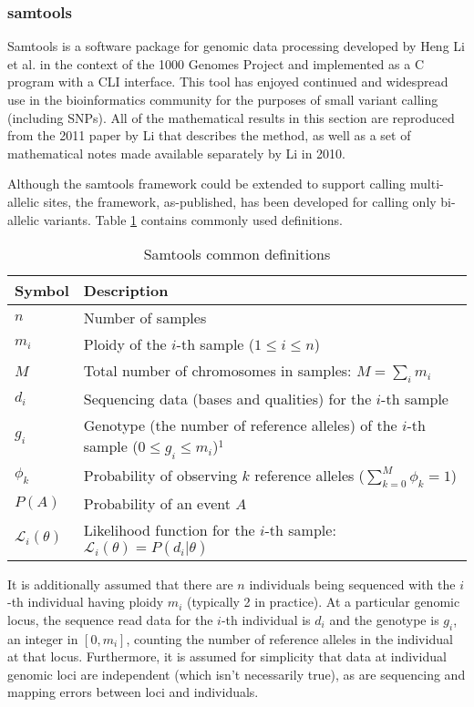 \subsubsection{samtools}
Samtools\autocite{li2009sequence} is a software package for genomic data processing developed by Heng Li et al. in the context of the 1000 Genomes Project\autocite{10002010map} and implemented as a C program with a CLI interface. This tool has enjoyed continued and widespread use in the bioinformatics community for the purposes of small variant calling (including SNPs). All of the mathematical results in this section are reproduced from the 2011 paper by Li\autocite{li2011statistical} that describes the method, as well as a set of mathematical notes made available separately by Li\autocite{li2010mathematical} in 2010.

Although the samtools framework could be extended to support calling multi-allelic sites, the framework, as-published, has been developed for calling only bi-allelic variants. Table \ref{tab:samtools_notation} contains commonly used definitions.

\begin{table}[!htb]
    \caption{Samtools common definitions}
    \label{tab:samtools_notation}
    {\begin{tabular}{lp{7cm}}
    \toprule
    Symbol & Description \\
    \midrule
    $n$ & Number of samples \\
    $m_i$ & Ploidy of the $i$-th sample ($1\le i\le n$)\\
    $M$ & Total number of chromosomes in samples: $M=\sum_i m_i$\\
    $d_i$ & Sequencing data (bases and qualities) for the $i$-th sample\\
    $g_i$ & Genotype (the number of reference alleles) of the $i$-th sample \mbox{($0\le g_i\le m_i$)}$^1$\\
    $\phi_k$ & Probability of observing $k$ reference alleles ($\sum_{k=0}^M\phi_k=1$) \\
    $P(A)$ & Probability of an event $A$\\
    $\mathcal{L}_i(\theta)$ & Likelihood function for the $i$-th sample: $\mathcal{L}_i(\theta)=P(d_i|\theta)$ \\
    \bottomrule
    \end{tabular}}
\end{table}

It is additionally assumed that there are $n$ individuals being sequenced with the $i$-th individual having ploidy $m_i$ (typically 2 in practice). At a particular genomic locus, the sequence read data for the $i$-th individual is $d_i$ and the genotype is $g_i$, an integer in $[0,m_i]$, counting the number of reference alleles in the individual at that locus. Furthermore, it is assumed for simplicity that data at individual genomic loci are independent (which isn't necessarily true), as are sequencing and mapping errors between loci and individuals.

